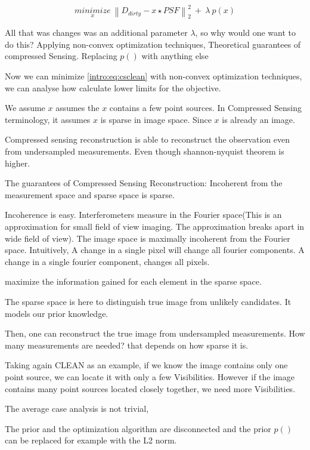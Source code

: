 \begin{equation}\label{intro:eq:csclean}
\underset{x}{minimize} \: \left \| D_{dirty} - x \star PSF \right \|_2^2 \: + \: \lambda \: p(x) 
\end{equation}

All that was changes was an additional parameter $\lambda$, so why would one want to do this? 
Applying non-convex optimization techniques,
Theoretical guarantees of compressed Sensing.
Replacing $p()$ with anything else

Now we can minimize \eqref{intro:eq:csclean} with non-convex optimization techniques, we can analyse how calculate lower limits for the objective.


We assume $x$ assumes the $x$ contains a few point sources. In Compressed Sensing terminology, it assumes $x$ is sparse in image space. Since $x$ is already an image.


Compressed sensing reconstruction is able to reconstruct the observation even from undersampled measurements. Even though shannon-nyquist theorem is higher.

The guarantees of Compressed Sensing Reconstruction: Incoherent from the measurement space and sparse space is sparse.

Incoherence is easy. Interferometers measure in the Fourier space(This is an approximation for small field of view imaging. The approximation breaks apart in wide field of view). The image space is maximally incoherent from the Fourier space. Intuitively, A change in a single pixel will change all fourier components. A change in a single fourier component, changes all pixels.

maximize the information gained for each element in the sparse space.

The sparse space is here to distinguish true image from unlikely candidates. It models our prior knowledge.

Then, one can reconstruct the true image from undersampled measurements. How many measurements are needed? that depends on how sparse it is. 

Taking again CLEAN as an example, if we know the image contains only one point source, we can locate it with only a few Visibilities. However if the image contains many point sources located closely together, we need more Visibilities.

The average case analysis is not trivial, 

The prior and the optimization algorithm are disconnected and the prior $p()$ can be replaced for example with the L2 norm.

